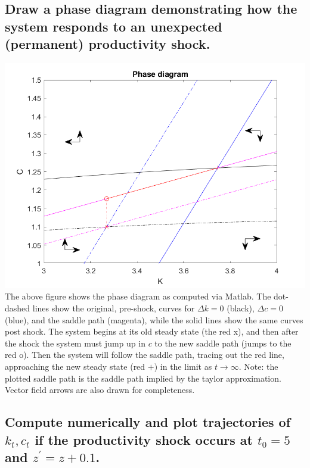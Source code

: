 \documentclass[11pt]{article} %
\begin{document}
\subsection{Draw a phase diagram demonstrating how the system responds to an unexpected (permanent) productivity shock.}
\includegraphics{phase}
The above figure shows the phase diagram as computed via Matlab. The dot-dashed lines show the original, pre-shock, curves for $\Delta k = 0$ (black), $\Delta c = 0$ (blue), and the saddle path (magenta), while the solid lines show the same curves post shock. The system begins at its old steady state (the red x), and then after the shock the system must jump up in $c$ to the new saddle path (jumps to the red o). Then the system will follow the saddle path, tracing out the red line, approaching the new steady state (red $+$) in the limit as $t \rightarrow \infty$. Note: the plotted saddle path is the saddle path implied by the taylor approximation. Vector field arrows are also drawn for completeness.

\subsection{Compute numerically and plot trajectories of $k_t,c_t$ if the productivity shock occurs at $t_0 = 5$ and $z^{'} = z+0.1$.}
\end{document}
